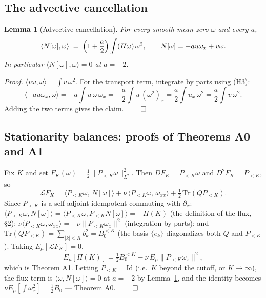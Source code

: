 \documentclass[11pt]{article}
\newtheorem{lemma}[theorem]{Lemma}
\theoremstyle{remark}
\theoremstyle{plain}
\begin{document}
\subsection{The advective cancellation}

\begin{lemma}[Advective cancellation]\label{lem:cancel}
For every smooth mean-zero $\omega$ and every $a$,
\begin{equation}
  \langle N[\omega], \omega\rangle \;=\; \Bigl(1 + \frac a2\Bigr)\int (H\omega)\,\omega^2,
  \qquad N[\omega] = -a u\omega_x + v\omega .
\end{equation}
In particular $\langle N[\omega],\omega\rangle = 0$ at $a = -2$.
\end{lemma}

\emph{Proof.} $\langle v\omega, \omega\rangle = \int v\,\omega^2$. For the transport term,
integrate by parts using (H3):
\begin{equation}
  \langle -a u\omega_x, \omega\rangle = -a\int u\,\omega\,\omega_x
  = -\frac a2 \int u\,(\omega^2)_x = \frac a2 \int u_x\,\omega^2 = \frac a2 \int v\,\omega^2 .
\end{equation}
Adding the two terms gives the claim. $\qed$

\subsection{Stationarity balances: proofs of Theorems A0 and A1}

Fix $K$ and set $F_K(\omega) = \tfrac12\|P_{<K}\omega\|_{L^2}^2$. Then $DF_K = P_{<K}\omega$
and $D^2F_K = P_{<K}$, so
\begin{equation}
  \mathcal{L}F_K = \langle P_{<K}\omega,\, N[\omega]\rangle
  + \nu\,\langle P_{<K}\omega,\, \omega_{xx}\rangle
  + \tfrac12\,\mathrm{Tr}(Q P_{<K}) .
\end{equation}
Since $P_{<K}$ is a self-adjoint idempotent commuting with $\partial_x$:
$\langle P_{<K}\omega, N[\omega]\rangle = \langle P_{<K}\omega, P_{<K}N[\omega]\rangle = -\Pi(K)$
(the definition of the flux, \S2);
$\nu\langle P_{<K}\omega, \omega_{xx}\rangle = -\nu\|P_{<K}\omega_x\|^2$ (integration by
parts); and $\mathrm{Tr}(Q P_{<K}) = \sum_{|k|<K} b_k^2 = B_0^{<K}$ (the basis $\{e_k\}$
diagonalizes both $Q$ and $P_{<K}$). Taking $E_\mu[\mathcal{L}F_K] = 0$,
\begin{equation}
  E_\mu[\Pi(K)] = \tfrac12 B_0^{<K} - \nu\,E_\mu\|P_{<K}\omega_x\|^2 ,
\end{equation}
which is Theorem A1. Letting
$P_{<K} = \mathrm{Id}$ (i.e.\ $K$ beyond the cutoff, or $K\to\infty$), the flux term is
$\langle \omega, N[\omega]\rangle = 0$ at $a=-2$ by Lemma~\ref{lem:cancel}, and the identity becomes
$\nu E_\mu[\int\omega_x^2] = \tfrac12 B_0$ --- Theorem A0. $\qed$
\end{document}
